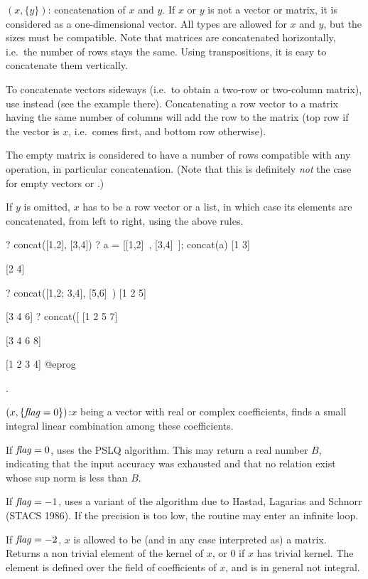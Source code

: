 $(x,\{y\})$: concatenation of $x$ and $y$. If $x$ or $y$ is
not a vector or matrix, it is considered as a one-dimensional vector. All
types are allowed for $x$ and $y$, but the sizes must be compatible. Note
that matrices are concatenated horizontally, i.e.~the number of rows stays
the same. Using transpositions, it is easy to concatenate them vertically.

To concatenate vectors sideways (i.e.~to obtain a two-row or two-column
matrix), use  instead (see the example there). Concatenating a row
vector to a matrix having the same number of columns will add the row to the
matrix (top row if the vector is $x$, i.e.~comes first, and bottom row
otherwise).

The empty matrix \kbd{[;]} is considered to have a number of rows compatible
with any operation, in particular concatenation. (Note that this is
definitely \emph{not} the case for empty vectors \kbd{[~]} or \kbd{[~]\til}.)

If $y$ is omitted, $x$ has to be a row vector or a list, in which case its
elements are concatenated, from left to right, using the above rules.

\bprog
? concat([1,2], [3,4])
? a = [[1,2]~, [3,4]~]; concat(a)
[1 3]

[2 4]

? concat([1,2; 3,4], [5,6]~)
[1 2 5]

[3 4 6]
? concat([%
[1 2 5 7]

[3 4 6 8]

[1 2 3 4]
@eprog

.

$(x,\{\hbox{\it f\kern0pt lag\/}=0\})$:$x$ being a
vector with real or complex coefficients, finds a small integral linear
combination among these coefficients.

If $\hbox{\it f\kern0pt lag\/}=0$, uses the PSLQ algorithm. This may return a real number $B$,
indicating that the input accuracy was exhausted and that no relation exist
whose sup norm is less than $B$.

If $\hbox{\it f\kern0pt lag\/}=-1$, uses a variant of the  algorithm due to Hastad,
Lagarias and Schnorr (STACS 1986). If the precision is too low, the routine
may enter an infinite loop.

If $\hbox{\it f\kern0pt lag\/}=-2$, $x$ is allowed to be (and in any case interpreted as) a matrix.
Returns a non trivial element of the kernel of $x$, or $0$ if $x$ has trivial
kernel. The element is defined over the field of coefficients of $x$, and is
in general not integral.

